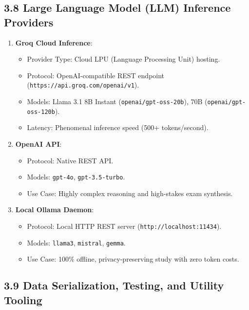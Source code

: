 \documentclass[
]{article}
\providecommand{\tightlist}{%
  \setlength{\itemsep}{0pt}\setlength{\parskip}{0pt}}
\begin{document}
\subsection{3.8 Large Language Model (LLM) Inference
Providers}\label{large-language-model-llm-inference-providers}

\begin{enumerate}
\def\labelenumi{\arabic{enumi}.}
\tightlist
\item
  \textbf{Groq Cloud Inference}:

  \begin{itemize}
  \tightlist
  \item
    Provider Type: Cloud LPU (Language Processing Unit) hosting.
  \item
    Protocol: OpenAI-compatible REST endpoint
    (\texttt{https:/\allowbreak /\allowbreak api.\allowbreak groq.\allowbreak com/\allowbreak openai/\allowbreak v1}).
  \item
    Models: Llama 3.1 8B Instant (\texttt{openai/\allowbreak gpt-oss-20b}), 70B
    (\texttt{openai/\allowbreak gpt-oss-120b}).
  \item
    Latency: Phenomenal inference speed (500+ tokens/second).
  \end{itemize}
\item
  \textbf{OpenAI API}:

  \begin{itemize}
  \tightlist
  \item
    Protocol: Native REST API.
  \item
    Models: \texttt{gpt-4o}, \texttt{gpt-3.5-turbo}.
  \item
    Use Case: Highly complex reasoning and high-stakes exam synthesis.
  \end{itemize}
\item
  \textbf{Local Ollama Daemon}:

  \begin{itemize}
  \tightlist
  \item
    Protocol: Local HTTP REST server (\texttt{http:/\allowbreak /\allowbreak localhost:11434}).
  \item
    Models: \texttt{llama3}, \texttt{mistral}, \texttt{gemma}.
  \item
    Use Case: 100\% offline, privacy-preserving study with zero token
    costs.
  \end{itemize}
\end{enumerate}

\subsection{3.9 Data Serialization, Testing, and Utility
Tooling}\label{data-serialization-testing-and-utility-tooling}
\end{document}
